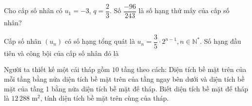 \begin{vd}[TH]%
	Cho cấp số nhân có $u_1=-3$, $q=\dfrac{2}{3}$. Số $\dfrac{-96}{243}$ là số hạng thứ mấy của cấp số nhân?
\end{vd}

\begin{vd}[TH]%
	Cấp số nhân $\left(u_{n}\right)$ có số hạng tổng quát là $u_n=\dfrac{3}{5} \cdot 2^{n-1}, n \in \mathbb{N}^*$. Số hạng đầu tiên và công bội của cấp số nhân đó là
\end{vd}

\begin{vd}[VD]%
	Người ta thiết kế một cái tháp gồm $10$ tầng theo cách: Diện tích bề mặt trên của mỗi tầng bằng nửa diện tích bề mặt trên của tầng ngay bên dưới và diện tích bề mặt của tầng 1 bằng nửa diện tích bề mặt đế tháp. Biết diện tích bề mặt đế tháp là $12\, 288$ m$^2$, tính diện tích bề mặt trên cùng của tháp.
\end{vd}

